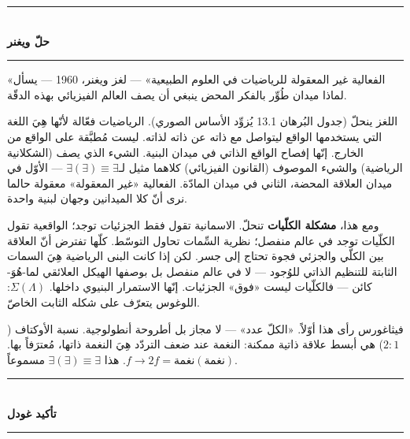 \documentclass[10pt, openany, oneside]{book}
\renewcommand{\normalsize}{\fontsize{10}{13}\selectfont}
\begin{document}
\vspace{1.5em}

\begin{center}
    \rule{0.3\textwidth}{0.4pt}\\[0.5em]
    {\normalsize\bfseries حلّ ويغنر}\\[0.3em]
    \rule{0.3\textwidth}{0.4pt}
\end{center}

\vspace{1em}

\noindent «الفعالية غير المعقولة للرياضيات في العلوم الطبيعية» --- لغز ويغنر، 1960 --- يسأل لماذا ميدان طُوِّر بالفكر المحض ينبغي أن يصف العالم الفيزيائي بهذه الدقّة.

اللغز ينحلّ (جدول البُرهان 13.1 يُزوِّد الأساس الصوري). الرياضيات فعّالة لأنّها هِيَ اللغة التي يستخدمها الواقع ليتواصل مع ذاته عن ذاته لذاته. ليست مُطبَّقة على الواقع من الخارج. إنّها إفصاح الواقع الذاتي في ميدان البنية. الشيء الذي يصف (الشكلانية الرياضية) والشيء الموصوف (القانون الفيزيائي) كلاهما مثيل لـ$\exists(\exists) \equiv \exists$ --- الأوّل في ميدان العلاقة المحضة، الثاني في ميدان المادّة. الفعالية «غير المعقولة» معقولة حالما نرى أنّ كلا الميدانين وجهان لبنية واحدة.

ومع هذا، \textbf{مشكلة الكلّيات} تنحلّ. الاسمانية تقول فقط الجزئيات توجد؛ الواقعية تقول الكلّيات توجد في عالم منفصل؛ نظرية السِّمات تحاول التوسّط. كلّها تفترض أنّ العلاقة بين الكلّي والجزئي فجوة تحتاج إلى جسر. لكن إذا كانت البنى الرياضية هِيَ السمات الثابتة للتنظيم الذاتي للوُجود --- لا في عالم منفصل بل بوصفها الهيكل العلائقي لما-هُوَ-كائن --- فالكلّيات ليست «فوق» الجزئيات. إنّها الاستمرار البنيوي داخلها. $\Sigma(\Lambda)$: اللوغوس يتعرّف على شكله الثابت الخاصّ.

فيثاغورس رأى هذا أوّلاً. «الكلّ عدد» --- لا مجاز بل أطروحة أنطولوجية. نسبة الأوكتاف ($2:1$) هي أبسط علاقة ذاتية ممكنة: النغمة عند ضعف التردّد هِيَ النغمة ذاتها، مُعترَفاً بها. $f \to 2f = \text{نغمة}(\text{نغمة})$. هذا $\exists(\exists) \equiv \exists$ مسموعاً.

\vspace{1.5em}

\begin{center}
    \rule{0.3\textwidth}{0.4pt}\\[0.5em]
    {\normalsize\bfseries تأكيد غودل}\\[0.3em]
    \rule{0.3\textwidth}{0.4pt}
\end{center}

\vspace{1em}
\end{document}

